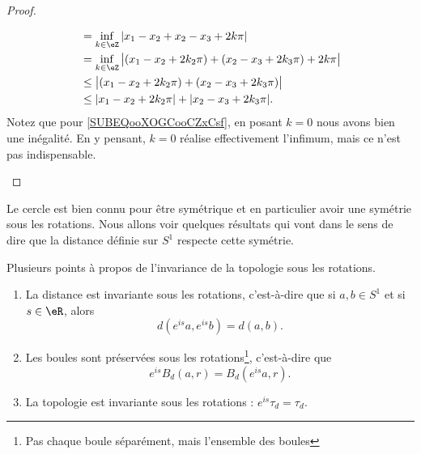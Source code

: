 \begin{proof}
\begin{enumerate}
\begin{itemize}
\begin{subequations}
\begin{align}
					                       & =\inf_{k\in \eZ}| x_1-x_2+x_2-x_3+2k\pi |                                                        \\
					                       & =\inf_{k\in \eZ}\big|  (x_1-x_2+2k_2\pi)+(x_2-x_3+2k_3\pi) +2k\pi \big|                          \\
					                       & \leq	\big|  (x_1-x_2+2k_2\pi)+(x_2-x_3+2k_3\pi) \big|                \label{SUBEQooXOGCooCZxCsf} \\
					                       & \leq | x_1-x_2+2k_2\pi |+| x_2-x_3+2k_3\pi |.
				            \end{align}
			            \end{subequations}
			            Notez que pour \eqref{SUBEQooXOGCooCZxCsf}, en posant \( k=0\) nous avons bien une inégalité. En y pensant, \( k=0\) réalise effectivement l'infimum, mais ce n'est pas indispensable.
		      \end{itemize}
	\end{enumerate}
\end{proof}

Le cercle est bien connu pour être symétrique et en particulier avoir une symétrie sous les rotations. Nous allons voir quelques résultats qui vont dans le sens de dire que la distance définie sur \( S^1\) respecte cette symétrie.

\begin{lemma}       \label{LEMooCQCAooAEctbe}
	Plusieurs points à propos de l'invariance de la topologie sous les rotations.
	\begin{enumerate}
		\item
		      La distance est invariante sous les rotations, c'est-à-dire que si \( a,b\in S^1\) et si \( s\in \eR\), alors
		      \begin{equation}
			      d( e^{is}a, e^{is}b)=d(a,b).
		      \end{equation}
		\item       \label{ITEMooCIPYooTyPQLj}
		      Les boules sont préservées sous les rotations\footnote{Pas chaque boule séparément, mais l'ensemble des boules}, c'est-à-dire que
		      \begin{equation}
			      e^{is}B_d(a,r)=B_d( e^{is}a,r).
		      \end{equation}
		\item
		      La topologie est invariante sous les rotations : \(  e^{is}\tau_d=\tau_d\).
	\end{enumerate}
\end{lemma}

